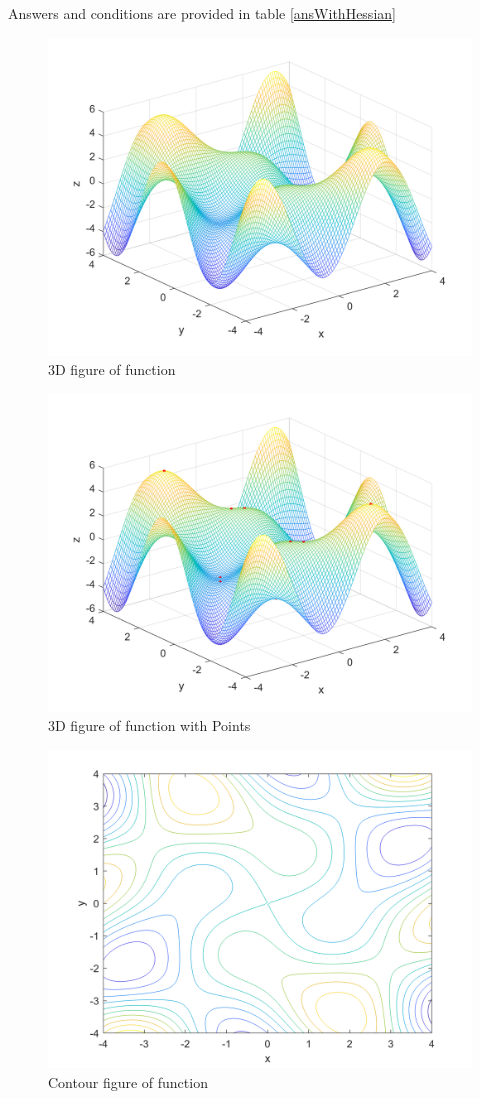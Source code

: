 Answers and conditions are provided in table \ref{ansWithHessian}
\begin{figure}[H]
	\caption{3D figure of function}
	\centering
	\includegraphics[width=12cm]{Q1/figures/3Dplot.png}
\end{figure}
\begin{figure}[H]
	\caption{3D figure of function with Points}
	\centering
	\includegraphics[width=12cm]{Q1/figures/3DplotWithPoints.png}
\end{figure}
\begin{figure}[H]
	\caption{Contour figure of function}
	\centering
	\includegraphics[width=12cm]{Q1/figures/Contour.png}
\end{figure}
